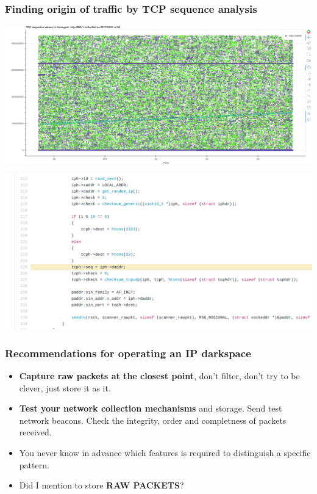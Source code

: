 \documentclass{beamer}
\begin{document}
\begin{frame}
\frametitle{Finding origin of traffic by TCP sequence analysis}
\includegraphics[scale=0.21]{isn-1.png}
\end{frame}

\begin{frame}
\includegraphics[scale=0.21]{mirai-isn.png}
\end{frame}

\begin{frame}
        \frametitle{Recommendations for operating an IP darkspace}
        \begin{itemize}
                \item {\bf Capture raw packets at the closest point}, don't filter, don't try to be clever, just store it as it.
                \item {\bf Test your network collection mechanisms} and storage. Send test network beacons. Check the integrity, order and completness of packets received.
                \item You never know in advance which features is required to distinguish a specific pattern.
                \item Did I mention to store {\bf RAW PACKETS}?
        \end{itemize}
\end{frame}
\end{document}
